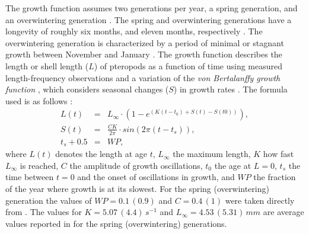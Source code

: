 The growth function assumes two generations per year, a spring generation, and an overwintering generation \citep{Wang2017Lifecycle}. The spring and overwintering generations have a longevity of roughly six months, and eleven months, respectively \citep{Wang2017Lifecycle}. The overwintering generation is characterized by a period of minimal or stagnant growth between November and January \citep{Wang2017Lifecycle}. The growth function describes the length or shell length ($L$) of pteropods as a function of time using measured length-frequency observations and a variation of the \textit{von Bertalanffy growth function} \citep[VBGF; ][]{Bertalanffy1938}, which considers seasonal changes ($S$) in growth rates \citep[Fig. \ref{fig:optimal_growth};][]{Wang2017Lifecycle}. The formula used is as follows \citep{Somers1988,Wang2017Lifecycle}:
\begin{eqnarray}
L(t) & = & L_{\infty} \cdot (1 - e^{(K(t-t_0) + S(t) - S(t0))}), \\
S(t) & = & \frac{CK}{2\pi} \cdot sin(2\pi (t-t_s)), \\
t_s + 0.5 & = & WP,
\end{eqnarray}
\noindent
where $L(t)$ denotes the length at age $t$, $L_{\infty}$ the maximum length, $K$ how fast $L_{\infty}$ is reached, $C$ the amplitude of growth oscillations, $t_0$ the age at $L=0$, $t_s$ the time between $t=0$ and the onset of oscillations in growth, and $WP$ the fraction of the year where growth is at its slowest. For the spring (overwintering) generation the values of $WP=0.1\,(0.9)$ and $C=0.4\,(1)$ were taken directly from \citep{Wang2017Lifecycle}. The values for $K=5.07\,(4.4)\, s^{-1}$ and $L_{\infty} = 4.53\,(5.31)\, mm$ are average values reported in \cite{Wang2017Lifecycle} for the spring (overwintering) generations.


